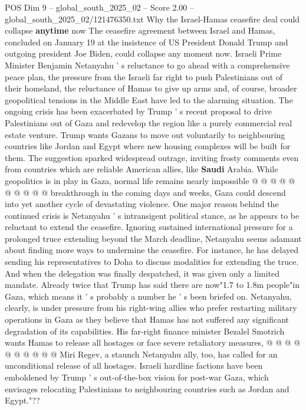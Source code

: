 \begin{textsample}{POS Dim 9 – global\_south\_2025\_02 – Score 2.00 – global\_south\_2025\_02/121476350.txt}  \label{ex:f9_pos_258}
Why the Israel-Hamas ceasefire deal could collapse \textbf{anytime} now The ceasefire agreement between Israel and Hamas, concluded on January 19 at the insistence of US President Donald Trump and outgoing president Joe Biden, could collapse any moment now.
Israeli Prime Minister Benjamin Netanyahu ' s reluctance to go ahead with a comprehensive peace plan, the pressure from the Israeli far right to push Palestinians out of their homeland, the reluctance of Hamas to give up arms and, of course, broader geopolitical tensions in the Middle East have led to the alarming situation.
The ongoing crisis has been exacerbated by Trump ' s recent proposal to drive Palestinians out of Gaza and redevelop the region like a purely commercial real estate venture.
Trump wants Gazans to move out voluntarily to neighbouring countries like Jordan and Egypt where new housing complexes will be built for them.
The suggestion sparked widespread outrage, inviting frosty comments even from countries which are reliable American allies, like \textbf{Saudi} Arabia.
While geopolitics is in play in Gaza, normal life remains nearly impossible @ @ @ @ @ @ @ @ @ @ breakthrough in the coming days and weeks, Gaza could descend into yet another cycle of devastating violence.
One major reason behind the continued crisis is Netanyahu ' s intransigent political stance, as he appears to be reluctant to extend the ceasefire.
Ignoring sustained international pressure for a prolonged truce extending beyond the March deadline, Netanyahu seems adamant about finding more ways to undermine the ceasefire.
For instance, he has delayed sending his representatives to Doha to discuss modalities for extending the truce.
And when the delegation was finally despatched, it was given only a limited mandate.
Already twice that Trump has said there are now"1.7 to 1.8m people"in Gaza, which means it ' s probably a number he ' s been briefed on.
Netanyahu, clearly, is under pressure from his right-wing allies who prefer restarting military operations in Gaza as they believe that Hamas has not suffered any significant degradation of its capabilities.
His far-right finance minister Bezalel Smotrich wants Hamas to release all hostages or face severe retaliatory measures, @ @ @ @ @ @ @ @ @ @ Miri Regev, a staunch Netanyahu ally, too, has called for an unconditional release of all hostages.
Israeli hardline factions have been emboldened by Trump ' s out-of-the-box vision for post-war Gaza, which envisages relocating Palestinians to neighbouring countries such as Jordan and Egypt."??

\end{textsample}
